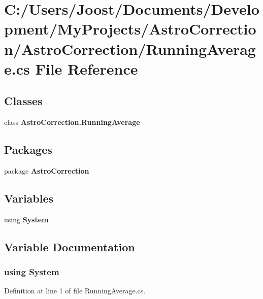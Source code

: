 \section{C:/Users/Joost/Documents/Development/MyProjects/AstroCorrection/AstroCorrection/RunningAverage.cs File Reference}
\label{_running_average_8cs}
\subsection*{Classes}
\begin{DoxyCompactItemize}
\item 
class {\bf AstroCorrection.RunningAverage}
\end{DoxyCompactItemize}
\subsection*{Packages}
\begin{DoxyCompactItemize}
\item 
package {\bf AstroCorrection}
\end{DoxyCompactItemize}
\subsection*{Variables}
\begin{DoxyCompactItemize}
\item 
﻿using {\bf System}
\end{DoxyCompactItemize}


\subsection{Variable Documentation}
\subsubsection[{System}]{\setlength{\rightskip}{0pt plus 5cm}﻿using {\bf System}}\label{_running_average_8cs_a81a223a02c34d82b47199f08308847f2}


Definition at line 1 of file RunningAverage.cs.